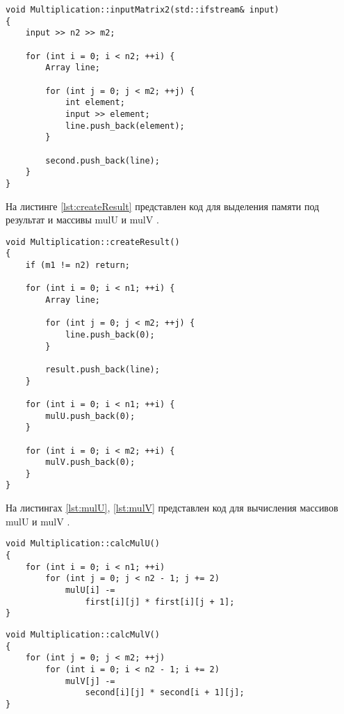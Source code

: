 \begin{lstlisting}[caption=Ввод второй матрицы,label=lst:inputMatrix2]
void Multiplication::inputMatrix2(std::ifstream& input)
{
    input >> n2 >> m2;

    for (int i = 0; i < n2; ++i) {
        Array line;

        for (int j = 0; j < m2; ++j) {
            int element;
            input >> element;
            line.push_back(element);
        }

        second.push_back(line);
    }
}
\end{lstlisting}

На листинге \ref{lst:createResult} представлен код для выделения памяти под результат
и массивы { \ttfamily mulU } и { \ttfamily mulV }.

\begin{lstlisting}[caption=Выделение памяти для результата и дополнительных массивов,label=lst:createResult]
void Multiplication::createResult()
{
    if (m1 != n2) return;

    for (int i = 0; i < n1; ++i) {
        Array line;

        for (int j = 0; j < m2; ++j) {
            line.push_back(0);
        }

        result.push_back(line);
    }

    for (int i = 0; i < n1; ++i) {
        mulU.push_back(0);
    }

    for (int i = 0; i < m2; ++i) {
        mulV.push_back(0);
    }
}
\end{lstlisting}

На листингах \ref{lst:mulU}, \ref{lst:mulV} представлен код для вычисления
массивов { \ttfamily mulU } и { \ttfamily mulV }.

\begin{lstlisting}[caption=Подсчет { \ttfamily mulU },label=lst:mulU]
void Multiplication::calcMulU()
{
    for (int i = 0; i < n1; ++i)
        for (int j = 0; j < n2 - 1; j += 2)
            mulU[i] -=
                first[i][j] * first[i][j + 1];
}
\end{lstlisting}

\begin{lstlisting}[caption=Подсчет { \ttfamily mulV },label=lst:mulV]
void Multiplication::calcMulV()
{
    for (int j = 0; j < m2; ++j)
        for (int i = 0; i < n2 - 1; i += 2)
            mulV[j] -=
                second[i][j] * second[i + 1][j];
}
\end{lstlisting}

